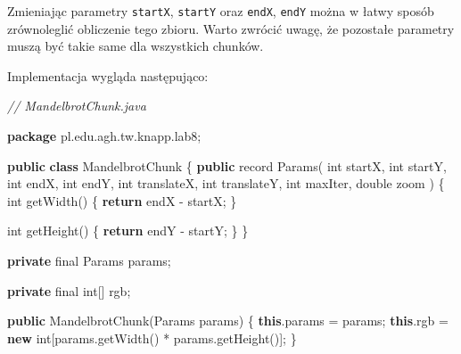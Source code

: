 \documentclass[11pt]{article}
\newenvironment{Shaded}{}{}
\newcommand{\KeywordTok}[1]{\textcolor[rgb]{0.00,0.44,0.13}{\textbf{{#1}}}}
\newcommand{\DataTypeTok}[1]{\textcolor[rgb]{0.56,0.13,0.00}{{#1}}}
\newcommand{\CommentTok}[1]{\textcolor[rgb]{0.38,0.63,0.69}{\textit{{#1}}}}
\newcommand{\FunctionTok}[1]{\textcolor[rgb]{0.02,0.16,0.49}{{#1}}}
\newcommand{\NormalTok}[1]{{#1}}
\newcommand{\ImportTok}[1]{{#1}}
\newcommand{\ControlFlowTok}[1]{\textcolor[rgb]{0.00,0.44,0.13}{\textbf{{#1}}}}
\newcommand{\OperatorTok}[1]{\textcolor[rgb]{0.40,0.40,0.40}{{#1}}}
\begin{document}
Zmieniając parametry \texttt{startX}, \texttt{startY} oraz
\texttt{endX}, \texttt{endY} można w łatwy sposób zrównoleglić
obliczenie tego zbioru. Warto zwrócić uwagę, że pozostałe parametry
muszą być takie same dla wszystkich chunków.

Implementacja wygląda następująco:

\begin{Shaded}
\begin{Highlighting}[]
\CommentTok{// MandelbrotChunk.java}

\KeywordTok{package}\ImportTok{ pl}\OperatorTok{.}\ImportTok{edu}\OperatorTok{.}\ImportTok{agh}\OperatorTok{.}\ImportTok{tw}\OperatorTok{.}\ImportTok{knapp}\OperatorTok{.}\ImportTok{lab8}\OperatorTok{;}

\KeywordTok{public} \KeywordTok{class}\NormalTok{ MandelbrotChunk }\OperatorTok{\{}
    \KeywordTok{public}\NormalTok{ record }\FunctionTok{Params}\OperatorTok{(}
            \DataTypeTok{int}\NormalTok{ startX}\OperatorTok{,}
            \DataTypeTok{int}\NormalTok{ startY}\OperatorTok{,}
            \DataTypeTok{int}\NormalTok{ endX}\OperatorTok{,}
            \DataTypeTok{int}\NormalTok{ endY}\OperatorTok{,}
            \DataTypeTok{int}\NormalTok{ translateX}\OperatorTok{,}
            \DataTypeTok{int}\NormalTok{ translateY}\OperatorTok{,}
            \DataTypeTok{int}\NormalTok{ maxIter}\OperatorTok{,}
            \DataTypeTok{double}\NormalTok{ zoom}
    \OperatorTok{)} \OperatorTok{\{}
        \DataTypeTok{int} \FunctionTok{getWidth}\OperatorTok{()} \OperatorTok{\{}
            \ControlFlowTok{return}\NormalTok{ endX }\OperatorTok{{-}}\NormalTok{ startX}\OperatorTok{;}
        \OperatorTok{\}}

        \DataTypeTok{int} \FunctionTok{getHeight}\OperatorTok{()} \OperatorTok{\{}
            \ControlFlowTok{return}\NormalTok{ endY }\OperatorTok{{-}}\NormalTok{ startY}\OperatorTok{;}
        \OperatorTok{\}}
    \OperatorTok{\}}

    \KeywordTok{private} \DataTypeTok{final}\NormalTok{ Params params}\OperatorTok{;}

    \KeywordTok{private} \DataTypeTok{final} \DataTypeTok{int}\OperatorTok{[]}\NormalTok{ rgb}\OperatorTok{;}

    \KeywordTok{public} \FunctionTok{MandelbrotChunk}\OperatorTok{(}\NormalTok{Params params}\OperatorTok{)} \OperatorTok{\{}
        \KeywordTok{this}\OperatorTok{.}\FunctionTok{params} \OperatorTok{=}\NormalTok{ params}\OperatorTok{;}
        \KeywordTok{this}\OperatorTok{.}\FunctionTok{rgb} \OperatorTok{=} \KeywordTok{new} \DataTypeTok{int}\OperatorTok{[}\NormalTok{params}\OperatorTok{.}\FunctionTok{getWidth}\OperatorTok{()} \OperatorTok{*}\NormalTok{ params}\OperatorTok{.}\FunctionTok{getHeight}\OperatorTok{()];}
    \OperatorTok{\}}


\end{Highlighting}
\end{Shaded}
\end{document}
